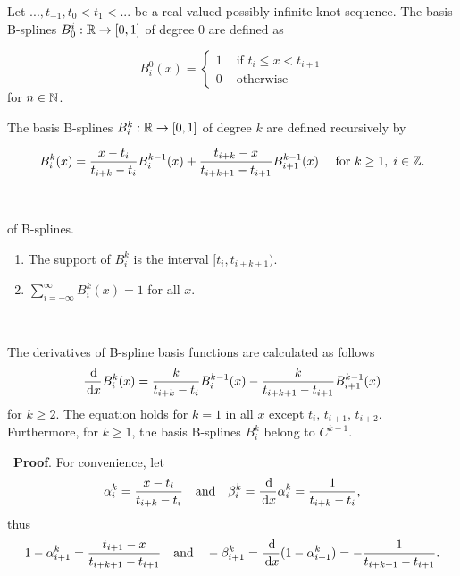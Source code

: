 \begin{definition}\label{Bspline}
Let $...,t_{-1},t_0<t_1<...$ be a real valued possibly infinite knot sequence. The basis B-splines $B_0^i: \mathbb R \to [0,1]$ of degree 0 are defined as

\begin{equation}
  B_i^0(x) = 
  \begin{cases}
    1 & \mbox{ if } t_i\leq x < t_{i+1}\\
    0 & \mbox{ otherwise}
  \end{cases}
\end{equation}
for $n\in\mathbb N$.

The basis B-splines $B_i^k:\mathbb R\to [0,1]$ of degree $k$ are defined recursively by

\begin{equation}
  B_i^k(x) = \frac{x-t_i}{t_{i+k}-t_i} B_i^{k-1}(x) + \frac{t_{i+k}-x}{t_{i+k+1}-t_{i+1}} B_{i+1}^{k-1}(x) \quad \text{ for } k\geq 1,\;i\in \Z.\label{recurDef}
\end{equation}
\end{definition}\

\begin{remark} of B-splines.
  \begin{enumerate}
    \item The support of $B_i^k$ is the interval $[t_i,t_{i+k+1})$.
    \item $\displaystyle\sum_{i=-\infty}^\infty B_i^k(x) = 1$ for all $x$.\label{property2}
  \end{enumerate}
\end{remark}\

\begin{lemma}\label{derBspline}
  The derivatives of B-spline basis functions are calculated as follows
  \begin{equation}
    \frac{\df}{\df x} B_i^k(x) = \frac{k}{t_{i+k}-t_i}B_i^{k-1}(x) - \frac{k}{t_{i+k+1}-t_{i+1}}B_{i+1}^{k-1}(x)\label{DerBspline}
  \end{equation}
  for $k\geq 2$. The equation holds for $k=1$ in all $x$ except $t_i,\,t_{i+1},\,t_{i+2}$.
  Furthermore, for $k\geq 1$, the basis B-splines $B_i^k$ belong to $C^{k-1}$.
\end{lemma}\
\textbf{Proof}. For convenience, let 
\[
  \alpha_i^k = \frac{x-t_i}{t_{i+k}-t_{i}} \quad\mbox{and}\quad \beta_i^k = \frac{\,{\rm d}}{\,{\rm d} x} \alpha_i^k = \frac{1}{t_{i+k}-t_{i}},
\]
thus
\[
  1-\alpha_{i+1}^k = \frac{t_{i+1}-x}{t_{i+k+1}-t_{i+1}} \quad\mbox{and}\quad -\beta_{i+1}^k = \frac{\,{\rm d}}{\,{\rm d} x} (1-\alpha_{i+1}^k) = -\frac{1}{t_{i+k+1}-t_{i+1}}.
\]

